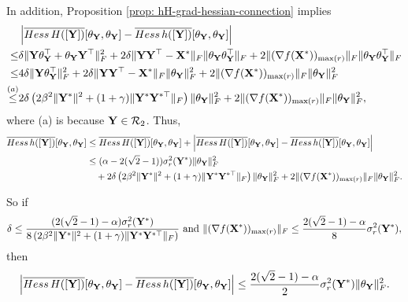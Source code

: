 \documentclass[11pt]{article}
\newcommand{\0}{{\mathbf{0}}}
\newcommand{\1}{{\mathbf{1}}}
\newcommand{\X}{{\mathbf{X}}}
\newcommand{\Y}{{\mathbf{Y}}}
\newcommand{\cR}{{\cal R}}
\newcommand{\Hess}{{\rm Hess}}
\newcommand{\F}{{\rm F}}
\newcommand{\nc}{\normalcolor}
\begin{document}
In addition, Proposition \ref{prop: hH-grad-hessian-connection} implies
\begin{equation*}
	\begin{split}
		&\left| \overline{\Hess\, H([\Y])}[\theta_\Y, \theta_\Y] - \overline{\Hess\, h([\Y])}[\theta_\Y, \theta_\Y]  \right| \\
		 \leq & \delta  \|\Y\theta_\Y^\top + \theta_\Y \Y^\top \|_\F^2 + 2 \delta \|\Y\Y^\top - \X^*\|_\F \|\theta_\Y \theta_\Y^\top\|_\F + 2 \| ( \nabla f(\X^*) )_{\max(r)} \|_\F \|\theta_\Y \theta_\Y^\top\|_\F \\
		 \leq & 4\delta \|\Y \theta_\Y^{ \top \nc}\|_\F^2  + 2 \delta  \|\Y\Y^\top - \X^*\|_\F \|\theta_\Y\|_\F^2 + 2 \| ( \nabla f(\X^*) )_{\max(r)} \|_\F \|\theta_\Y\|_\F^2 \\
		 \overset{(a)} \leq & 2 \delta \left( 2 \beta^2 \|\Y^*\|^2 + (1+\gamma) \| \Y^* \Y^{*\top} \|_\F  \right) \|\theta_\Y\|_\F^2 +  2 \| ( \nabla f(\X^*) )_{\max(r)} \|_\F \|\theta_\Y\|_\F^2,
	\end{split}
\end{equation*} where (a) is because $\Y \in \cR_2$.
	Thus,
\begin{equation*}
	\begin{split}
		 \overline{\Hess\, h([\Y])}[\theta_\Y, \theta_\Y] &\leq  \overline{\Hess\, H([\Y])}[\theta_\Y, \theta_\Y] + \left| \overline{\Hess\, H([\Y])}[\theta_\Y, \theta_\Y] - \overline{\Hess\, h([\Y])}[\theta_\Y, \theta_\Y]  \right| \\
		 & \leq  (\alpha - 2 ( \sqrt{2} - 1 ))  \sigma^2_r(\Y^*) \|\theta_\Y\|_\F^2 \\
		 & \quad +  2 \delta \left( 2 \beta^2 \|\Y^*\|^2 + (1+\gamma) \| \Y^* \Y^{*\top} \|_\F  \right) \|\theta_\Y\|_\F^2 +  2 \| ( \nabla f(\X^*) )_{\max(r)} \|_\F \|\theta_\Y\|_\F^2 .
	\end{split}
\end{equation*}
	


 So if 
\begin{equation*}
	\delta \leq \frac{( 2 (\sqrt{2} -1) -\alpha ) \sigma^2_r(\Y^*)  }{8 \left( 2 \beta^2 \|\Y^*\|^2 + (1 + \gamma ) \| \Y^* \Y^{*\top} \|_\F   \right) } \text{ and } \| ( \nabla f(\X^*) )_{\max(r)} \|_\F \leq \frac{ 2 ( \sqrt{2} - 1 ) - \alpha }{8} \sigma^2_r(\Y^*),
\end{equation*}
then
\begin{equation*}
	\left| \overline{\Hess\, H([\Y])}[\theta_\Y, \theta_\Y] - \overline{\Hess\, h([\Y])}[\theta_\Y, \theta_\Y]  \right| \leq \frac{ 2 (\sqrt{2} -1) -\alpha  }{2} \sigma^2_r(\Y^*) \|\theta_\Y\|_\F^2.
\end{equation*}
	
\end{document}
